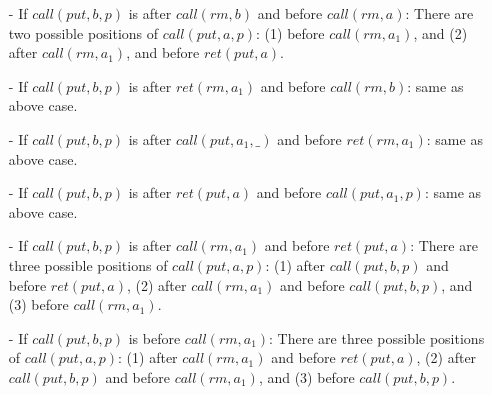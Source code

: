 \begin{itemize}
\setlength{\itemsep}{0.5pt}
\item[-] If $\textit{call}(\textit{put},b,p)$ is after $\textit{call}(\textit{rm},b)$ and before $\textit{call}(\textit{rm},a)$: There are two possible positions of $\textit{call}(\textit{put},a,p)$: (1) before $\textit{call}(\textit{rm},a_1)$, and (2) after $\textit{call}(\textit{rm},a_1)$, and before $\textit{ret}(\textit{put},a)$.

\item[-] If $\textit{call}(\textit{put},b,p)$ is after $\textit{ret}(\textit{rm},a_1)$ and before $\textit{call}(\textit{rm},b)$: same as above case.

\item[-] If $\textit{call}(\textit{put},b,p)$ is after $\textit{call}(\textit{put},a_1,\_)$ and before $\textit{ret}(\textit{rm},a_1)$: same as above case.

\item[-] If $\textit{call}(\textit{put},b,p)$ is after $\textit{ret}(\textit{put},a)$ and before $\textit{call}(\textit{put},a_1,p)$: same as above case.

\item[-] If $\textit{call}(\textit{put},b,p)$ is after $\textit{call}(\textit{rm},a_1)$ and before $\textit{ret}(\textit{put},a)$: There are three possible positions of $\textit{call}(\textit{put},a,p)$: (1) after $\textit{call}(\textit{put},b,p)$ and before $\textit{ret}(\textit{put},a)$, (2) after $\textit{call}(\textit{rm},a_1)$ and before $\textit{call}(\textit{put},b,p)$, and (3) before $\textit{call}(\textit{rm},a_1)$.

\item[-] If $\textit{call}(\textit{put},b,p)$ is before $\textit{call}(\textit{rm},a_1)$: There are three possible positions of $\textit{call}(\textit{put},a,p)$: (1) after $\textit{call}(\textit{rm},a_1)$ and before $\textit{ret}(\textit{put},a)$, (2) after $\textit{call}(\textit{put},b,p)$ and before $\textit{call}(\textit{rm},a_1)$, and (3) before $\textit{call}(\textit{put},b,p)$.
\end{itemize}

